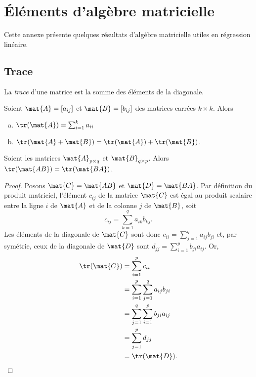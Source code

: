 \chapter{Éléments d'algèbre matricielle}
\label{chap:elements}

Cette annexe présente quelques résultats d'algèbre matricielle utiles
en régression linéaire.

\section{Trace}

La \emph{trace} d'une matrice est la somme des éléments de la diagonale.

\begin{thm}
  \label{thm:elements:trace}
  Soient $\mat{A} = [a_{ij}]$ et $\mat{B} = [b_{ij}]$ des matrices
  carrées $k \times k$. Alors
  \begin{enumerate}[a)]
  \item $\tr(\mat{A}) = \sum_{i=1}^k a_{ii}$
  \item $\tr(\mat{A} + \mat{B}) = \tr(\mat{A}) + \tr(\mat{B})$.
  \end{enumerate}
\end{thm}

\begin{thm}
  \label{thm:elements:symetrie_trace}
  Soient les matrices $\mat{A}_{p \times q}$ et $\mat{B}_{q \times
    p}$. Alors $\tr(\mat{AB}) = \tr(\mat{BA})$.
\end{thm}

\enlargethispage{\baselineskip}
\begin{proof}
  Posons $\mat{C} = \mat{AB}$ et $\mat{D} = \mat{BA}$. Par définition
  du produit matriciel, l'élément $c_{ij}$ de la matrice $\mat{C}$ est
  égal au produit scalaire entre la ligne $i$ de $\mat{A}$ et de la
  colonne $j$ de $\mat{B}$, soit
  \begin{displaymath}
    c_{ij} = \sum_{k=1}^q a_{ik} b_{kj}.
  \end{displaymath}
  Les éléments de la diagonale de $\mat{C}$ sont donc $c_{ii} =
  \sum_{j=1}^q a_{ij} b_{ji}$ et, par symétrie, ceux de la diagonale
  de $\mat{D}$ sont $d_{jj} = \sum_{i=1}^p b_{ji} a_{ij}$.  Or,
  \begin{align*}
    \tr(\mat{C})
    &= \sum_{i=1}^p c_{ii} \\
    &= \sum_{i=1}^p \sum_{j=1}^q a_{ij} b_{ji} \\
    &= \sum_{j=1}^q \sum_{i=1}^p b_{ji} a_{ij} \\
    &= \sum_{j=1}^p d_{jj} \\
    &= \tr(\mat{D}).
  \end{align*}
\end{proof}


